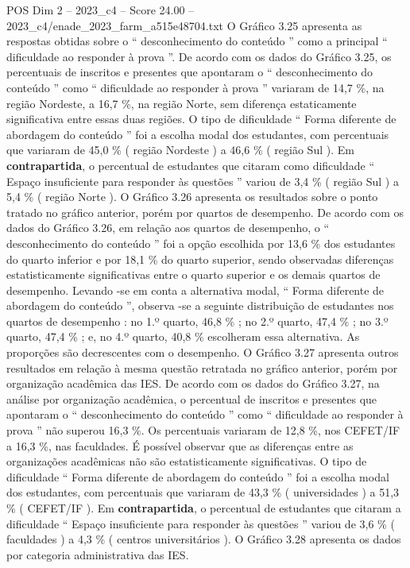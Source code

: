 \begin{textsample}{POS Dim 2 – 2023\_c4 – Score 24.00 – 2023\_c4/enade\_2023\_farm\_a515e48704.txt}
O Gráfico 3.25 apresenta as respostas obtidas sobre o “ desconhecimento do conteúdo ” como a principal “ dificuldade ao responder à prova ”.
De acordo com os dados do Gráfico 3.25, os percentuais de inscritos e presentes que apontaram o “ desconhecimento do conteúdo ” como “ dificuldade ao responder à prova ” variaram de 14,7 \%, na região Nordeste, a 16,7 \%, na região Norte, sem diferença estaticamente significativa entre essas duas regiões.
O tipo de dificuldade “ Forma diferente de abordagem do conteúdo ” foi a escolha modal dos estudantes, com percentuais que variaram de 45,0 \% ( região Nordeste ) a 46,6 \% ( região Sul ).
Em \textbf{contrapartida}, o percentual de estudantes que citaram como dificuldade “ Espaço insuficiente para responder às questões ” variou de 3,4 \% ( região Sul ) a 5,4 \% ( região Norte ).
O Gráfico 3.26 apresenta os resultados sobre o ponto tratado no gráfico anterior, porém por quartos de desempenho.
De acordo com os dados do Gráfico 3.26, em relação aos quartos de desempenho, o “ desconhecimento do conteúdo ” foi a opção escolhida por 13,6 \% dos estudantes do quarto inferior e por 18,1 \% do quarto superior, sendo observadas diferenças estatisticamente significativas entre o quarto superior e os demais quartos de desempenho.
Levando -se em conta a alternativa modal, “ Forma diferente de abordagem do conteúdo ”, observa -se a seguinte distribuição de estudantes nos quartos de desempenho : no 1.º quarto, 46,8 \% ; no 2.º quarto, 47,4 \% ; no 3.º quarto, 47,4 \% ; e, no 4.º quarto, 40,8 \% escolheram essa alternativa.
As proporções são decrescentes com o desempenho.
O Gráfico 3.27 apresenta outros resultados em relação à mesma questão retratada no gráfico anterior, porém por organização acadêmica das IES.
De acordo com os dados do Gráfico 3.27, na análise por organização acadêmica, o percentual de inscritos e presentes que apontaram o “ desconhecimento do conteúdo ” como “ dificuldade ao responder à prova ” não superou 16,3 \%.
Os percentuais variaram de 12,8 \%, nos CEFET/IF a 16,3 \%, nas faculdades.
É possível observar que as diferenças entre as organizações acadêmicas não são estatisticamente significativas.
O tipo de dificuldade “ Forma diferente de abordagem do conteúdo ” foi a escolha modal dos estudantes, com percentuais que variaram de 43,3 \% ( universidades ) a 51,3 \% ( CEFET/IF ).
Em \textbf{contrapartida}, o percentual de estudantes que citaram a dificuldade “ Espaço insuficiente para responder às questões ” variou de 3,6 \% ( faculdades ) a 4,3 \% ( centros universitários ).
O Gráfico 3.28 apresenta os dados por categoria administrativa das IES.

\end{textsample}
